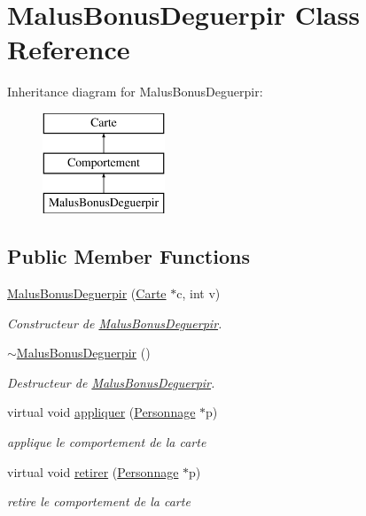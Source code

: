 \hypertarget{class_malus_bonus_deguerpir}{\section{Malus\-Bonus\-Deguerpir Class Reference}
\label{class_malus_bonus_deguerpir}
}
Inheritance diagram for Malus\-Bonus\-Deguerpir\-:\begin{figure}[H]
\begin{center}
\leavevmode
\includegraphics[height=3.000000cm]{class_malus_bonus_deguerpir}
\end{center}
\end{figure}
\subsection*{Public Member Functions}
\begin{DoxyCompactItemize}
\item 
\hyperlink{class_malus_bonus_deguerpir_a4e45b5b1be3f42cd2740294aaca609a0}{Malus\-Bonus\-Deguerpir} (\hyperlink{class_carte}{Carte} $\ast$c, int v)
\begin{DoxyCompactList}\small\item\em Constructeur de \hyperlink{class_malus_bonus_deguerpir}{Malus\-Bonus\-Deguerpir}. \end{DoxyCompactList}\item 
\hypertarget{class_malus_bonus_deguerpir_a9225653a1da567b995bead68d512a3e3}{\hyperlink{class_malus_bonus_deguerpir_a9225653a1da567b995bead68d512a3e3}{$\sim$\-Malus\-Bonus\-Deguerpir} ()}\label{class_malus_bonus_deguerpir_a9225653a1da567b995bead68d512a3e3}

\begin{DoxyCompactList}\small\item\em Destructeur de \hyperlink{class_malus_bonus_deguerpir}{Malus\-Bonus\-Deguerpir}. \end{DoxyCompactList}\item 
virtual void \hyperlink{class_malus_bonus_deguerpir_a703620e87d5d861ba850a3b07f61195a}{appliquer} (\hyperlink{class_personnage}{Personnage} $\ast$p)
\begin{DoxyCompactList}\small\item\em applique le comportement de la carte \end{DoxyCompactList}\item 
virtual void \hyperlink{class_malus_bonus_deguerpir_af7889dc668d138990d4e255c76bb8a89}{retirer} (\hyperlink{class_personnage}{Personnage} $\ast$p)
\begin{DoxyCompactList}\small\item\em retire le comportement de la carte \end{DoxyCompactList}\end{DoxyCompactItemize}
